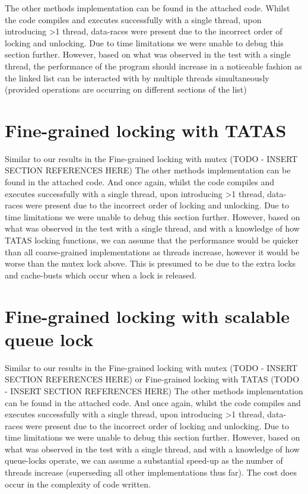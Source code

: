 The other methods implementation can be found in the attached code.
Whilst the code compiles and executes successfully with a single thread,
upon introducing >1 thread, data-races were present due to the incorrect order of locking 
and unlocking. 
Due to time limitations we were unable to debug this section further. 
However, based on what was observed in the test with a single thread, the performance of the 
program should increase in a noticeable fashion as the linked list can be interacted with by multiple threads 
simultaneously (provided operations are occurring on different sections of the list)

\section{Fine-grained locking with TATAS}

Similar to our results in the Fine-grained locking with mutex (TODO - INSERT SECTION REFERENCES HERE)
The other methods implementation can be found in the attached code.
And once again, whilst the code compiles and executes successfully with a single thread,
upon introducing >1 thread, data-races were present due to the incorrect order of locking 
and unlocking. 
Due to time limitations we were unable to debug this section further. 
However, based on what was observed in the test with a single thread, and with a knowledge of how TATAS locking functions,
we can assume that the performance would be quicker than all coarse-grained implementations as threads increase, however it would be worse than the mutex lock above.
This is presumed to be due to the extra locks and cache-busts which occur when a lock is released.

\section{Fine-grained locking with scalable queue lock}


Similar to our results in the Fine-grained locking with mutex (TODO - INSERT SECTION REFERENCES HERE) or Fine-grained locking with TATAS (TODO - INSERT SECTION REFERENCES HERE)
The other methods implementation can be found in the attached code.
And once again, whilst the code compiles and executes successfully with a single thread,
upon introducing >1 thread, data-races were present due to the incorrect order of locking 
and unlocking. 
Due to time limitations we were unable to debug this section further. 
However, based on what was observed in the test with a single thread, and with a knowledge of how queue-locks operate, 
we can assume a substantial speed-up as the number of threads increase (superseding all other implementations thus far). 
The cost does occur in the complexity of code written.
